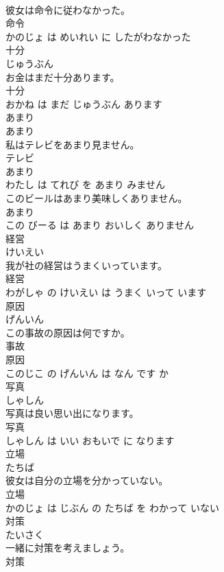 \documentclass[8pt]{extreport}
\begin{document}
\begin{CJK}{UTF8}{min}
\\	彼女は命令に従わなかった。	
\\	命令 
\\	かのじょ は めいれい に したがわなかった			
\\	十分	
\\	じゅうぶん			
\\	お金はまだ十分あります。	
\\	十分 
\\	おかね は まだ じゅうぶん あります			
\\	あまり	
\\	あまり			
\\	私はテレビをあまり見ません。	
\\	テレビ 
\\	あまり 
\\	わたし は てれび を あまり みません			
\\	このビールはあまり美味しくありません。	
\\	あまり 
\\	この びーる は あまり おいしく ありません			
\\	経営	
\\	けいえい			
\\	我が社の経営はうまくいっています。	
\\	経営 
\\	わがしゃ の けいえい は うまく いって います			
\\	原因	
\\	げんいん			
\\	この事故の原因は何ですか。	
\\	事故 
\\	原因 
\\	このじこ の げんいん は なん です か			
\\	写真	
\\	しゃしん			
\\	写真は良い思い出になります。	
\\	写真 
\\	しゃしん は いい おもいで に なります			
\\	立場	
\\	たちば			
\\	彼女は自分の立場を分かっていない。	
\\	立場 
\\	かのじょ は じぶん の たちば を わかって いない			
\\	対策	
\\	たいさく			
\\	一緒に対策を考えましょう。	
\\	対策 

\end{CJK}
\end{document}
